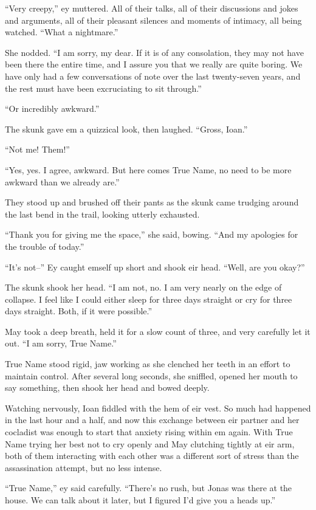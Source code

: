 ``Very creepy,'' ey muttered. All of their talks, all of their discussions and jokes and arguments, all of their pleasant silences and moments of intimacy, all being watched. ``What a nightmare.''

She nodded. ``I am sorry, my dear. If it is of any consolation, they may not have been there the entire time, and I assure you that we really are quite boring. We have only had a few conversations of note over the last twenty-seven years, and the rest must have been excruciating to sit through.''

``Or incredibly awkward.''

The skunk gave em a quizzical look, then laughed. ``Gross, Ioan.''

``Not me! Them!''

``Yes, yes. I agree, awkward. But here comes True Name, no need to be more awkward than we already are.''

They stood up and brushed off their pants as the skunk came trudging around the last bend in the trail, looking utterly exhausted.

``Thank you for giving me the space,'' she said, bowing. ``And my apologies for the trouble of today.''

``It's not--'' Ey caught emself up short and shook eir head. ``Well, are you okay?''

The skunk shook her head. ``I am not, no. I am very nearly on the edge of collapse. I feel like I could either sleep for three days straight or cry for three days straight. Both, if it were possible.''

May took a deep breath, held it for a slow count of three, and very carefully let it out. ``I am sorry, True Name.''

True Name stood rigid, jaw working as she clenched her teeth in an effort to maintain control. After several long seconds, she sniffled, opened her mouth to say something, then shook her head and bowed deeply.

Watching nervously, Ioan fiddled with the hem of eir vest. So much had happened in the last hour and a half, and now this exchange between eir partner and her cocladist was enough to start that anxiety rising within em again. With True Name trying her best not to cry openly and May clutching tightly at eir arm, both of them interacting with each other was a different sort of stress than the assassination attempt, but no less intense.

``True Name,'' ey said carefully. ``There's no rush, but Jonas was there at the house. We can talk about it later, but I figured I'd give you a heads up.''

